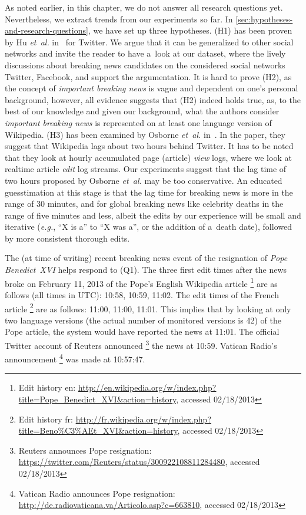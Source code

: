As noted earlier, in this chapter,
we do not answer all research questions yet.
Nevertheless, we extract trends from our experiments so far.
In \autoref{sec:hypotheses-and-research-questions},
we have set up three hypotheses.
(H1) has been proven by Hu \emph{et~al.} in~\cite{hu2012breakingnews} for Twitter.
We argue that it can be generalized to other social networks
and invite the reader to have a~look at our dataset,
where the lively discussions about breaking news candidates
on the considered social networks Twitter, Facebook, and \googleplus
support the argumentation.
It is hard to prove (H2), as the concept of \emph{important breaking news}
is vague and dependent on one's personal background, however,
all evidence suggests that (H2) indeed holds true,
as, to the best of our knowledge and given our background,
what the authors consider \emph{important breaking news}
is represented on at least one language version of Wikipedia.
(H3) has been examined by Osborne \emph{et~al.} in~\cite{osborne2012bieber}.
In the paper, they suggest that Wikipedia lags about two hours behind Twitter.
It has to be noted that they look at hourly accumulated page (article) \emph{view} logs,
where we look at realtime article \emph{edit} log streams.
Our experiments suggest that the lag time of two hours
proposed by Osborne \emph{et~al.} may be too conservative. 
An educated guesstimation at this stage is that the lag time
for breaking news is more in the range of 30 minutes,
and for global breaking news like celebrity deaths
in the range of five minutes and less,
albeit the edits by our experience will be small and iterative
(\emph{e.g.}, ``X is a'' to ``X was a'', or the addition of a~death date),
followed by more consistent thorough edits.

The (at time of writing) recent breaking news event
of the resignation of \emph{Pope Benedict~XVI} helps respond to (Q1).
The three first edit times after the news broke on February 11, 2013
of the Pope's English Wikipedia article%
\footnote{Edit history en: \url{http://en.wikipedia.org/w/index.php?title=Pope_Benedict_XVI&action=history},
accessed 02/18/2013} 
are as follows
(all times in UTC): 10:58, 10:59, 11:02.
The edit times of the French article%
\footnote{Edit history fr: \url{http://fr.wikipedia.org/w/index.php?title=Beno\%C3\%AEt_XVI&action=history}, accessed 02/18/2013}
are as follows: 11:00, 11:00, 11:01.
This implies that by looking at only two language versions
(the actual number of monitored versions is 42) of the Pope article,
the system would have reported the news at 11:01.
The official Twitter account of Reuters announced%
\footnote{Reuters announces Pope resignation: \url{https://twitter.com/Reuters/status/300922108811284480},
accessed 02/18/2013} the news at 10:59.
Vatican Radio's announcement%
\footnote{Vatican Radio announces Pope resignation: \url{http://de.radiovaticana.va/Articolo.asp?c=663810},
accessed 02/18/2013} was made at 10:57:47.

